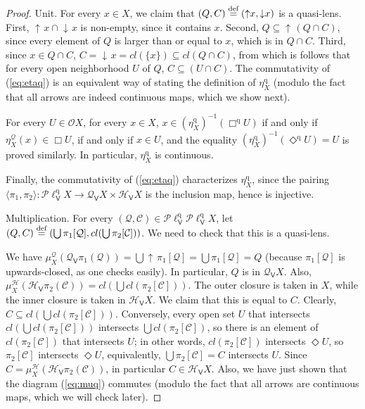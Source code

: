 \documentclass[preprint,12pt]{elsarticle}
\newcommand\eqdef{\mathrel{\buildrel \text{def}\over=}}
\DeclareMathOperator{\upc}{\uparrow\!}
\DeclareMathOperator{\dc}{\downarrow\!}
\newcommand\Smyth{{\mathcal Q}}
\newcommand\Hoare{{\mathcal H}}
\newcommand\Vt{\mathsf{V}}
\newcommand\HV{\Hoare_\Vt}
\newcommand\SV{\Smyth_{\Vt}}
\newcommand\quasi{\mathrm{q}} %
\newcommand\QL{\Plotkin^\quasi}
\newcommand\QLV{\QL_\Vt}
\newcommand\Plotkin{\mathcal P\ell} %
\newcommand\Open{{\mathcal O}}
\begin{document}
\begin{proof}
  Unit.  For every $x \in X$, we claim that
  $(Q, C) \eqdef (\upc x, \dc x)$ is a quasi-lens.  First,
  $\upc x \cap \dc x$ is non-empty, since it contains $x$.  Second,
  $Q \subseteq \upc (Q \cap C)$, since every element of $Q$ is larger
  than or equal to $x$, which is in $Q \cap C$.  Third, since
  $x \in Q \cap C$, $C = \dc x = cl (\{x\}) \subseteq cl (Q \cap C)$,
  from which is follows that for every open neighborhood $U$ of $Q$,
  $C \subseteq (U \cap C)$.  The commutativity of (\ref{eq:etaq}) is
  an equivalent way of stating the definition of $\eta^\quasi_X$
  (modulo the fact that all arrows are indeed continuous maps, which
  we show next).

  For every $U \in \Open X$, for every $x \in X$,
  $x \in {(\eta^\quasi_X)}^{-1} (\Box^\quasi U)$ if and only if
  $\eta^\Smyth_X (x) \in \Box U$, if and only if $x \in U$, and the
  equality ${(\eta^\quasi_X)}^{-1} (\Diamond^\quasi U) = U$ is proved
  similarly.  In particular, $\eta^\quasi_X$ is continuous.

  Finally, the commutativity of (\ref{eq:etaq}) characterizes
  $\eta^\quasi_X$, since the pairing
  $\langle \pi_1, \pi_2 \rangle \colon \QLV X \to \SV X \times \HV X$
  is the inclusion map, hence is injective.

  Multiplication.  For every
  $(\mathcal Q, \mathcal C) \in \QLV {\QLV X}$, let
  $(Q, C) \eqdef (\bigcup \pi_1 [\mathcal Q], \allowbreak cl (\bigcup
  \pi_2 [\mathcal C]))$.  We need to check that this is a quasi-lens.
  
  We have
  $\mu^\Smyth_X (\SV {\pi_1} (\mathcal Q)) = \bigcup \upc \pi_1
  [\mathcal Q] = \bigcup \pi_1 [\mathcal Q] = Q$ (because
  $\pi_1 [\mathcal Q]$ is upwards-closed, as one checks easily).  In
  particular, $Q$ is in $\SV X$.  Also,
  $\mu^\Hoare_X (\HV {\pi_2} (\mathcal C)) = cl (\bigcup cl (\pi_2
  [\mathcal C]))$.  The outer closure is taken in $X$, while the inner
  closure is taken in $\HV X$.  We claim that this is equal to $C$.
  Clearly, $C \subseteq cl (\bigcup cl (\pi_2 [\mathcal C]))$.
  Conversely, every open set $U$ that intersects
  $cl (\bigcup cl (\pi_2 [\mathcal C]))$ intersects
  $\bigcup cl (\pi_2 [\mathcal C])$, so there is an element of
  $cl (\pi_2 [\mathcal C])$ that intersects $U$; in other words,
  $cl (\pi_2 [\mathcal C])$ intersects $\Diamond U$, so
  $\pi_2 [\mathcal C]$ intersects $\Diamond U$, equivalently,
  $\bigcup \pi_2 [\mathcal C] = C$ intersects $U$.  Since
  $C = \mu^\Hoare_X (\HV {\pi_2} (\mathcal C))$, in particular
  $C \in \HV X$.  Also, we have just shown that the diagram
  (\ref{eq:muq}) commutes (modulo the fact that all arrows are
  continuous maps, which we will check later).


\end{proof}
\end{document}
